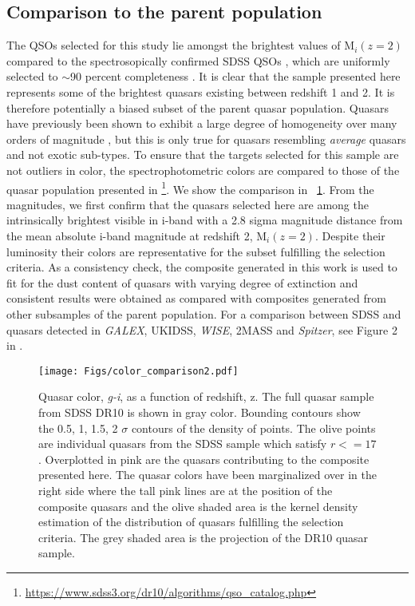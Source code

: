 \documentclass{aa}    %
\newcommand{\figref}[1]{\ref{fig:#1}}
\newcommand{\Fig}[1]{\figurename~\figref{#1}}
\newcommand{\fig}[1]{\Fig{#1}}
\newcommand{\figlabel}[1]{\label{fig:#1}}
\newcommand{\sectlabel}[1]{\label{sect:#1}}
\begin{document}
\subsection{Comparison to the parent population}  \sectlabel{parents}

The QSOs selected for this study lie amongst the brightest values of M$_i(z=2)$ compared to the spectrosopically confirmed SDSS QSOs \citep{Shen2011}, which are uniformly selected to $\sim$90 percent completeness \citep{Richards2002, VandenBerk2005}. It is clear that the sample presented here represents some of the brightest quasars existing between redshift 1 and 2. It is therefore potentially a biased subset of the parent quasar population. Quasars have previously been shown to exhibit a large degree of homogeneity over many orders of magnitude \citep{Dietrich2002}, but this is only true for quasars resembling \textit{average} quasars and not exotic sub-types. To ensure that the targets selected for this sample are not outliers in color, the spectrophotometric colors are compared to those of the quasar population presented in \citet{Paris2014}\footnote{\url{https://www.sdss3.org/dr10/algorithms/qso_catalog.php}}. We show the comparison in \fig{color_comparison}. From the magnitudes, we first confirm that the quasars selected here are among the intrinsically brightest visible in i-band with a 2.8 sigma magnitude distance from the mean absolute i-band magnitude at redshift 2, M$_i(z=2)$. Despite their luminosity their colors are representative for the subset fulfilling the selection criteria. As a consistency check, the composite generated in this work is used to fit for the dust content of quasars with varying degree of extinction and consistent results were obtained as compared with composites generated from other subsamples of the parent population. For a comparison between SDSS and quasars detected in \textit{GALEX}, UKIDSS, \textit{WISE}, 2MASS and \textit{Spitzer}, see Figure 2 in \citet{Krawczyk2013}.


 \begin{figure}[t!]
   \centering
   \texttt{[image: Figs/color\_comparison2.pdf]}
   \caption[]{Quasar color, \textit{g-i},  as a function of redshift, z. The full quasar sample from SDSS DR10 \citep{Paris2014} is shown in gray color. Bounding contours show the 0.5, 1, 1.5, 2 $\sigma$ contours of the density of points. The olive points are individual quasars from the SDSS sample which satisfy $r <= 17$. Overplotted in pink are the quasars contributing to the composite presented here. The quasar colors have been marginalized over in the right side where the tall pink lines are at the position of the composite quasars and the olive shaded area is the kernel density estimation of the distribution of quasars fulfilling the selection criteria. The grey shaded area is the projection of the DR10 quasar sample.}
  \figlabel{color_comparison}
 \end{figure}
\end{document}
